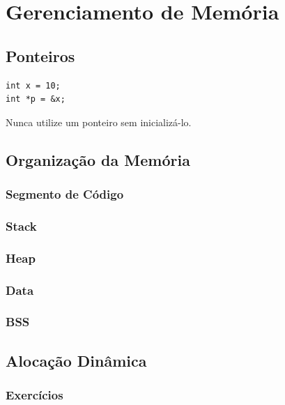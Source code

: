 \documentclass[12pt,a4paper,oneside]{extreport}
\begin{document}
\part{Gerenciamento de Memória}


\chapter{Ponteiros}

\begin{lstlisting}
int x = 10;
int *p = &x;
\end{lstlisting}


\begin{importante}

Nunca utilize um ponteiro sem inicializá-lo.

\end{importante}


\chapter{Organização da Memória}

\section{Segmento de Código}

\section{Stack}

\section{Heap}

\section{Data}

\section{BSS}


\chapter{Alocação Dinâmica}

\section*{Exercícios}
\end{document}
